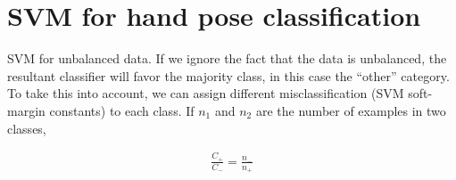 \section{SVM for hand pose classification}
SVM for unbalanced data. \cite{ben2010}
If we ignore the  fact that the data is unbalanced, the resultant classifier
will favor the majority class, in this case the ``other'' category. To take this
into account, we can assign different misclassification (SVM soft-margin
constants) to each class. If $n_1$ and $n_2$ are the number of examples in two
classes, 

\begin{align}
\frac{C_+}{C_-} = \frac{n_-}{n_+}
\end{align}

\begin{figure}
\centering
{}
\subfigure[]{
  \includegraphics[width=0.5\linewidth,
}
\end{figure}
